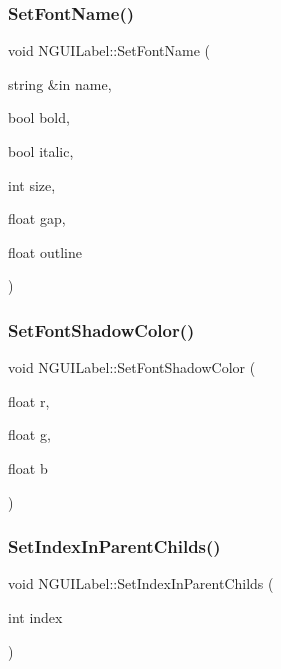 \hypertarget{class_n_g_u_i_label_a738e844e6eee5822ab52d13cd3c74c69}{}\label{class_n_g_u_i_label_a738e844e6eee5822ab52d13cd3c74c69} 
\subsubsection{\texorpdfstring{Set\+Font\+Name()}{SetFontName()}}
{\footnotesize\ttfamily void N\+G\+U\+I\+Label\+::\+Set\+Font\+Name (\begin{DoxyParamCaption}\item[{string \&in}]{name,  }\item[{bool}]{bold,  }\item[{bool}]{italic,  }\item[{int}]{size,  }\item[{float}]{gap,  }\item[{float}]{outline }\end{DoxyParamCaption})}

\hypertarget{class_n_g_u_i_label_a3045e4014941e347bd6a15d7a9c588df}{}\label{class_n_g_u_i_label_a3045e4014941e347bd6a15d7a9c588df} 
\subsubsection{\texorpdfstring{Set\+Font\+Shadow\+Color()}{SetFontShadowColor()}}
{\footnotesize\ttfamily void N\+G\+U\+I\+Label\+::\+Set\+Font\+Shadow\+Color (\begin{DoxyParamCaption}\item[{float}]{r,  }\item[{float}]{g,  }\item[{float}]{b }\end{DoxyParamCaption})}

\hypertarget{class_n_g_u_i_label_a0d82c546be7c09e4877c757939db7b69}{}\label{class_n_g_u_i_label_a0d82c546be7c09e4877c757939db7b69} 
\subsubsection{\texorpdfstring{Set\+Index\+In\+Parent\+Childs()}{SetIndexInParentChilds()}}
{\footnotesize\ttfamily void N\+G\+U\+I\+Label\+::\+Set\+Index\+In\+Parent\+Childs (\begin{DoxyParamCaption}\item[{int}]{index }\end{DoxyParamCaption})}

